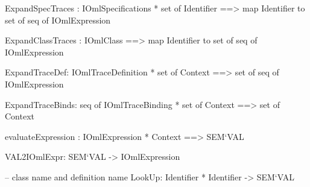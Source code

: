

ExpandSpecTraces : IOmlSpecifications * set of Identifier ==>
  map Identifier to set of seq of IOmlExpression

ExpandClassTraces : IOmlClass ==>
  map Identifier to set of seq of IOmlExpression

ExpandTraceDef: IOmlTraceDefinition * set of Context ==> 
                set of seq of IOmlExpression

ExpandTraceBinds: seq of IOmlTraceBinding * set of Context ==> 
                  set of Context

evaluateExpression : IOmlExpression * Context ==>  SEM`VAL

VAL2IOmlExpr: SEM`VAL -> IOmlExpression

-- class name and definition name
LookUp: Identifier * Identifier -> SEM`VAL